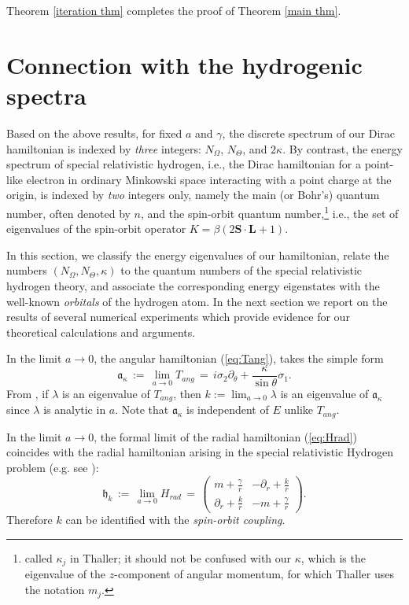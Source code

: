 \documentclass[11 pt]{article}
\renewcommand\({\left(}
\renewcommand\){\right)}
\newcommand\<{\langle}
\renewcommand\>{\rangle}
\newcommand\8{\infty}
\newcommand\beq{\begin{equation}}
\newcommand\eeq{\end{equation}}
\newcommand{\ga} {\gamma}\newcommand{\Ga}{\Gamma}
\newcommand{\ka} {\kappa}
\newcommand{\la} {\lambda}\newcommand{\La}{\Lambda}
\newcommand{\si} {\sigma}\newcommand{\Si}{\Sigma}
\newcommand{\pd}{\partial}
\newcommand{\fa}{\mathfrak{a}}
\newcommand{\bS}{\mathbf{S}}
\newcommand{\bL}{\mathbf{L}}
\newcommand{\fh}{\mathfrak{h}}
\begin{document}
\medskip
\medskip

Theorem \ref{iteration thm} completes the proof of Theorem \ref{main thm}. 


\section{Connection with the hydrogenic spectra}

Based on the above results, for fixed $a$ and $\ga$, the discrete spectrum of our Dirac hamiltonian is indexed by {\em three} integers: $N_\Omega$, $N_\Theta$,  and $2\kappa$.  
By contrast, the energy spectrum of special relativistic hydrogen, i.e., the Dirac hamiltonian for a point-like electron in ordinary Minkowski space interacting with a point charge at the origin, is indexed by {\em two} integers only, namely the main (or Bohr's) quantum number, often denoted by $n$, and the spin-orbit quantum number,\footnote{called $\kappa_j$ in Thaller; it should not be confused with our $\kappa$, which is the eigenvalue of the $z$-component of angular momentum, for which Thaller uses the notation $m_j$.}
 i.e., the set of eigenvalues of the spin-orbit operator $K = \beta(2\bS\cdot\bL +1)$.  



In this section, we classify the energy eigenvalues of our hamiltonian, relate the numbers $(N_{\Omega},N_{\Theta},\kappa)$ to the quantum numbers of the special relativistic hydrogen theory, and associate the corresponding energy eigenstates with the well-known {\em orbitals} of the hydrogen atom. In the next section we report on the results of several numerical experiments which provide evidence for our theoretical calculations and arguments.


In the limit $a \to 0$, the angular hamiltonian (\ref{eq:Tang}),  takes the simple form
\beq\label{eq:Tang0}
\fa_\ka \,:=\, \lim_{a\to 0} T_{ang} \,=\,  i\si_2 \pd_\theta + \frac{\ka}{\sin\theta} \si_1.
\eeq
From \cite{BSW}, if $\la$ is an eigenvalue of $T_{ang}$, then $k := \lim_{a \to 0} \la$ is an eigenvalue of $\fa_\ka$ since $\la$ is analytic in $a$. Note that $\fa_\ka$ is independent of $E$ unlike $T_{ang}$.

In the limit $a\to 0$, the formal limit of the radial hamiltonian (\ref{eq:Hrad}) coincides with the radial hamiltonian arising in the special relativistic Hydrogen problem (e.g. see \cite[eq. (7.105)]{ThallerBOOK}):
\beq\label{eq:Hrad0}
\fh_{k} \,:=\, \lim_{a\to 0} H_{rad} \,=\, \left(\begin{array}{cc} m  + \frac{\gamma}{r} & -\pd_r + \frac{k}{r} \\[20pt]
 \pd_r +\frac{k}{r} & -m + \frac{\gamma}{r}  \end{array}\right).
\eeq
Therefore $k$ can be identified with the \emph{spin-orbit coupling}.
\end{document}

